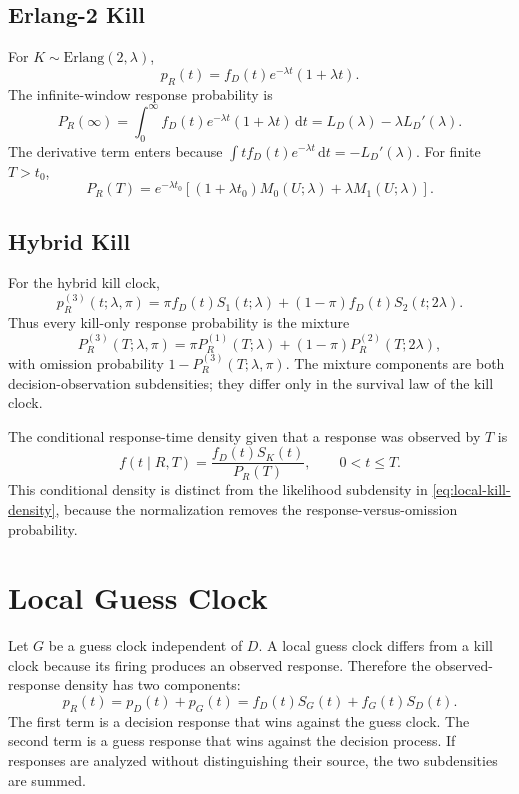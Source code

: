 \documentclass[12pt]{article}
\newcommand{\dd}{\,\mathrm{d}}
\begin{document}
\subsection{Erlang-2 Kill}
For $K\sim\mathrm{Erlang}(2,\lambda)$,
\begin{equation}
  p_R(t)=f_D(t)e^{-\lambda t}(1+\lambda t).
\end{equation}
The infinite-window response probability is
\begin{equation}
  P_R(\infty)
  =\int_0^\infty f_D(t)e^{-\lambda t}(1+\lambda t)\dd t
  =L_D(\lambda)-\lambda L_D'(\lambda).
  \label{eq:erlang2-kill-prob}
\end{equation}
The derivative term enters because $\int t f_D(t)e^{-\lambda t}\dd t=-L_D'(\lambda)$. For finite $T>t_0$,
\begin{equation}
  P_R(T)=e^{-\lambda t_0}
  \left[(1+\lambda t_0)M_0(U;\lambda)+\lambda M_1(U;\lambda)\right].
  \label{eq:erlang2-kill-window}
\end{equation}

\subsection{Hybrid Kill}
For the hybrid kill clock,
\begin{equation}
  p_R^{(3)}(t;\lambda,\pi)
  =
  \pi f_D(t)S_1(t;\lambda)
  +(1-\pi)f_D(t)S_2(t;2\lambda).
  \label{eq:hybrid-kill-density}
\end{equation}
Thus every kill-only response probability is the mixture
\begin{equation}
  P_R^{(3)}(T;\lambda,\pi)
  =
  \pi P_R^{(1)}(T;\lambda)
  +(1-\pi)P_R^{(2)}(T;2\lambda),
  \label{eq:hybrid-kill-window}
\end{equation}
with omission probability $1-P_R^{(3)}(T;\lambda,\pi)$. The mixture components are both decision-observation subdensities; they differ only in the survival law of the kill clock.

The conditional response-time density given that a response was observed by $T$ is
\begin{equation}
  f(t\mid R,T)=\frac{f_D(t)S_K(t)}{P_R(T)},
  \qquad 0<t\le T.
\end{equation}
This conditional density is distinct from the likelihood subdensity in \eqref{eq:local-kill-density}, because the normalization removes the response-versus-omission probability.

\section{Local Guess Clock}
Let $G$ be a guess clock independent of $D$. A local guess clock differs from a kill clock because its firing produces an observed response. Therefore the observed-response density has two components:
\begin{equation}
  p_R(t)=p_D(t)+p_G(t)
  =f_D(t)S_G(t)+f_G(t)S_D(t).
  \label{eq:local-guess-density}
\end{equation}
The first term is a decision response that wins against the guess clock. The second term is a guess response that wins against the decision process. If responses are analyzed without distinguishing their source, the two subdensities are summed.
\end{document}
